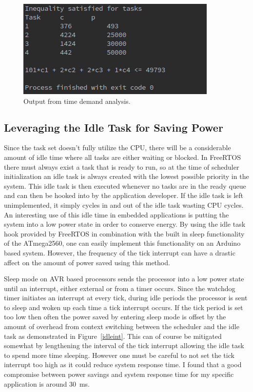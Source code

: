 \documentclass{article}
\begin{document}
    \begin{figure}[H]
\centering
        \includegraphics[scale=.75]{timedemand.png}
    \caption{Output from time demand analysis.}
    \label{fig:timedemand}
\end{figure}


\subsection{Leveraging the Idle Task for Saving Power}

Since the task set doesn't fully utilize the CPU, there will be a considerable amount of idle time where all tasks are either waiting or blocked. In FreeRTOS there must always exist a task that is ready to run, so at the time of scheduler initialization an idle task is always created with the lowest possible priority in the system. This idle task is then executed whenever no tasks are in the ready queue and can then be hooked into by the application developer. If the idle task is left unimplemented, it simply cycles in and out of the idle task wasting CPU cycles. An interesting use of this idle time in embedded applications is putting the system into a low power state in order to conserve energy. By using the idle task hook provided by FreeRTOS in combination with the built in sleep functionality of the ATmega2560, one can easily implement this functionality on an Arduino based system. However, the frequency of the tick interrupt can have a drastic affect on the amount of power saved using this method.

	Sleep mode on AVR based processors sends the processor into a low power state until an interrupt, either external or from a timer occurs. Since the watchdog timer initiates an interrupt at every tick, during idle periods the processor is sent to sleep and woken up each time a tick interrupt occurs. If the tick period is set too low then often the power saved by entering sleep mode is offset by the amount of overhead from context switching between the scheduler and the idle task as demonstrated in Figure~\ref{idleint}. This can of course be mitigated somewhat by lengthening the interval of the tick interrupt allowing the idle task to spend more time sleeping. However one must be careful to not set the tick interrupt too high as it could reduce system response time. I found that a good compromise between power savings and system response time for my specific application is around \SI{30}{\milli\second}.
    
\end{document}
